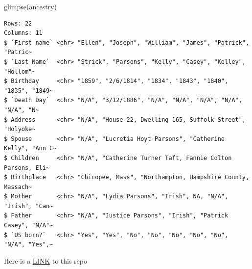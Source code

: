 \documentclass[
  letterpaper,
  DIV=11,
  numbers=noendperiod]{scrartcl}
\newenvironment{Shaded}{\begin{snugshade}}{\end{snugshade}}
\newcommand{\FunctionTok}[1]{\textcolor[rgb]{0.28,0.35,0.67}{#1}}
\newcommand{\NormalTok}[1]{\textcolor[rgb]{0.00,0.23,0.31}{#1}}
\begin{document}
\begin{Shaded}
\begin{Highlighting}[]
\FunctionTok{glimpse}\NormalTok{(ancestry)}
\end{Highlighting}
\end{Shaded}

\begin{verbatim}
Rows: 22
Columns: 11
$ `First name` <chr> "Ellen", "Joseph", "William", "James", "Patrick", "Patric~
$ `Last Name`  <chr> "Strick", "Parsons", "Kelly", "Casey", "Kelley", "Hollom"~
$ Birthday     <chr> "1859", "2/6/1814", "1834", "1843", "1840", "1835", "1849~
$ `Death Day`  <chr> "N/A", "3/12/1886", "N/A", "N/A", "N/A", "N/A", "N/A", "N~
$ Address      <chr> "N/A", "House 22, Dwelling 165, Suffolk Street", "Holyoke~
$ Spouse       <chr> "N/A", "Lucretia Hoyt Parsons", "Catherine Kelly", "Ann C~
$ Children     <chr> "N/A", "Catherine Turner Taft, Fannie Colton Parsons, Eli~
$ Birthplace   <chr> "Chicopee, Mass", "Northampton, Hampshire County, Massach~
$ Mother       <chr> "N/A", "Lydia Parsons", "Irish", NA, "N/A", "Irish", "Can~
$ Father       <chr> "N/A", "Justice Parsons", "Irish", "Patrick Casey", "N/A"~
$ `US born?`   <chr> "Yes", "Yes", "No", "No", "No", "No", "No", "N/A", "Yes",~
\end{verbatim}

Here is a
\href{https://github.com/STAT210-S23/Parsons_Paper_Register}{LINK} to
this repo
\end{document}
